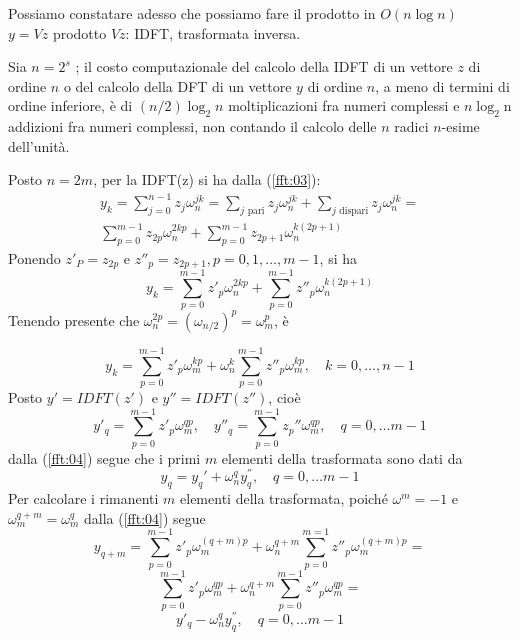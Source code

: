 Possiamo constatare adesso che possiamo fare il prodotto in $O(n \log n)$ \\
$y = Vz$ prodotto $Vz$: IDFT, trasformata inversa. 
\begin{theo}
  Sia $n = 2^s$ ; il costo computazionale del calcolo della IDFT di un
  vettore $z$ di ordine $n$ o del calcolo della DFT di un vettore $y$ di
  ordine $n$, a meno di termini di ordine inferiore, \`e di $(n/2) \log_2
  n$ moltiplicazioni fra numeri complessi e $n \log_2 $n addizioni fra
  numeri complessi, non contando il calcolo delle $n$ radici $n$-esime
  dell'unit\`a.
\end{theo}

\begin{thproof}
Posto $n=2m$, per la IDFT(z) si ha dalla (\ref{fft:03}):
$$
  \begin{array}{c}
y_k = \displaystyle \sum_{j=0}^{n-1}
z_j \omega_n^{jk} = 
\displaystyle \sum_{j \text{ pari}} z_j \omega_n^{jk}  +
\displaystyle \sum_{j \text{ dispari}} z_j \omega_n^{jk}        
=
\\
\displaystyle \sum_{p=0}^{m-1}z_{2p} \omega_{n}^{2kp}
+
\displaystyle \sum_{p=0}^{m-1}z_{2p+1} \omega_{n}^{k(2p+1)}
  \end{array}
$$
Ponendo $z'_P = z_{2p}$ e $z''_p = z_{2p+1}, p = 0,1, \ldots, m-1$,
si ha
$$
y_k = \displaystyle \sum_{p=0}^{m-1}z'_{p} \omega_{n}^{2kp}
+
\displaystyle \sum_{p=0}^{m-1}z''_{p} \omega_{n}^{k(2p+1)}
$$
Tenendo presente che $\omega_n^{2p} = (\omega_{n/2})^{p} =
\omega_m^{p}$, \`e

\begin{equation}
  \label{fft:04}
y_k = \displaystyle \sum_{p=0}^{m-1}  z'_{p} \omega_{m}^{kp}
+
\omega_n^{k} \displaystyle \sum_{p=0}^{m-1}z''_{p} \omega_{m}^{kp},
\quad k=0, \ldots, n-1  
\end{equation}
Posto $y'=IDFT(z')$ e $y''=IDFT(z'')$, cio\`e
$$
y'_q = \displaystyle \sum_{p=0}^{m-1} z'_p \omega_{m}^{qp},
\quad
y''_q = \displaystyle \sum_{p=0}^{m-1} z_p'' \omega_{m}^{qp},
\quad q=0, \ldots m-1
$$
dalla   (\ref{fft:04}) segue che i primi $m$ elementi
della trasformata sono dati da
\begin{equation}
  \label{fft:05}
y_q = y_q' + \omega_n^{q} y_q^{''}, \quad q=0, \ldots m-1  
\end{equation}
Per calcolare i rimanenti $m$ elementi della trasformata,
poich\'e $\omega^{m} = -1$ e 
$\omega_m^{q+m} = \omega_m^{q}$ dalla
(\ref{fft:04}) segue
$$
y_{q+m} = \displaystyle \sum_{p=0}^{m-1} z'_p \omega_m^{(q+m)p}
 + \omega_n^{q+m} \displaystyle \sum_{p=0}^{m=1} z''_p
\omega_m^{(q+m)p} =
$$
$$
 \displaystyle \sum_{p=0}^{m-1} z'_p \omega_m^{qp}
   + \omega_n^{q+m} \displaystyle 
\sum_{p=0}^{m-1} z''_p \omega_m^{qp} =
$$
\begin{equation}
  \label{fft:06}
y'_q - \omega_n^{q} y_q^{''}, \quad q =0, \ldots m-1  
\end{equation}


\end{thproof}
